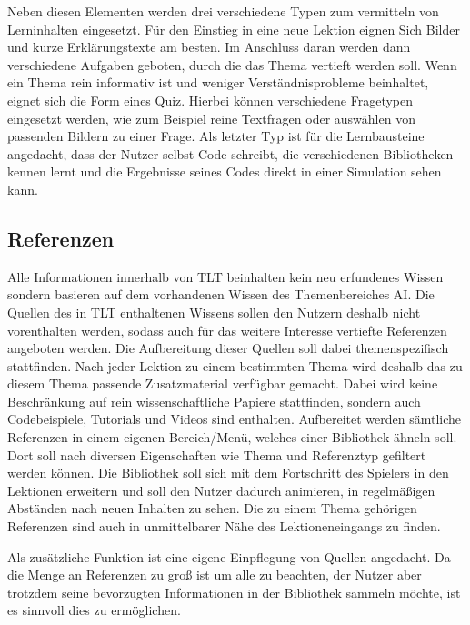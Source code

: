 Neben diesen Elementen werden drei verschiedene Typen zum vermitteln von Lerninhalten eingesetzt. Für den Einstieg in eine neue Lektion eignen Sich Bilder und kurze Erklärungstexte am besten. Im Anschluss daran werden dann verschiedene Aufgaben geboten, durch die das Thema vertieft werden soll. Wenn ein Thema rein informativ ist und weniger Verständnisprobleme beinhaltet, eignet sich die Form eines Quiz. Hierbei können verschiedene Fragetypen eingesetzt werden, wie zum Beispiel reine Textfragen oder auswählen von passenden Bildern zu einer Frage. Als letzter Typ ist für die Lernbausteine angedacht, dass der Nutzer selbst Code schreibt, die verschiedenen Bibliotheken kennen lernt und die Ergebnisse seines Codes direkt in einer Simulation sehen kann.


\subsection{Referenzen}
\label{lm_referenzen}

Alle Informationen innerhalb von TLT beinhalten kein neu erfundenes Wissen sondern basieren auf dem vorhandenen Wissen des Themenbereiches AI. Die Quellen des in TLT enthaltenen Wissens sollen den Nutzern deshalb nicht vorenthalten werden, sodass auch für das weitere Interesse vertiefte Referenzen angeboten werden. Die Aufbereitung dieser Quellen soll dabei themenspezifisch stattfinden. Nach jeder Lektion zu einem bestimmten Thema wird deshalb das zu diesem Thema passende Zusatzmaterial verfügbar gemacht. Dabei wird keine Beschränkung auf rein wissenschaftliche Papiere stattfinden, sondern auch Codebeispiele, Tutorials und Videos sind enthalten. Aufbereitet werden sämtliche Referenzen in einem eigenen Bereich/Menü, welches einer Bibliothek ähneln soll. Dort soll nach diversen Eigenschaften wie Thema und Referenztyp gefiltert werden können. Die Bibliothek soll sich mit dem Fortschritt des Spielers in den Lektionen erweitern und soll den Nutzer dadurch animieren, in regelmäßigen Abständen nach neuen Inhalten zu sehen. Die zu einem Thema gehörigen Referenzen sind auch in unmittelbarer Nähe des Lektioneneingangs zu finden. 

Als zusätzliche Funktion ist eine eigene Einpflegung von Quellen angedacht. Da die Menge an Referenzen zu groß ist um alle zu beachten, der Nutzer aber trotzdem seine bevorzugten Informationen in der Bibliothek sammeln möchte, ist es sinnvoll dies zu ermöglichen.